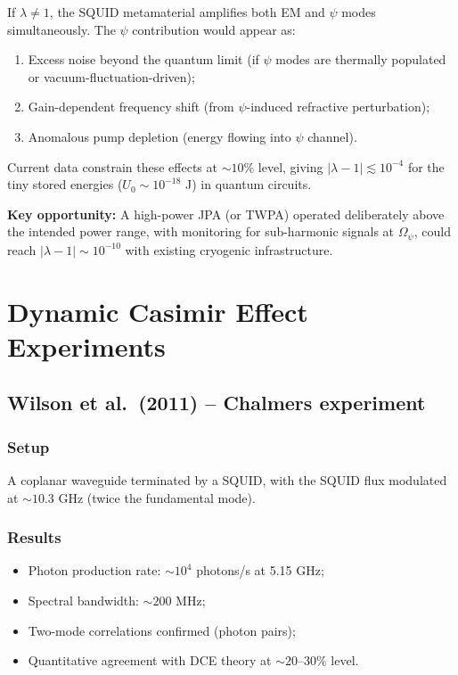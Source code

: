 \documentclass[12pt,letterpaper]{article}
\begin{document}
If $\lambda \neq 1$, the SQUID metamaterial amplifies both EM and
$\psi$ modes simultaneously.  The $\psi$ contribution would appear as:
\begin{enumerate}[noitemsep]
  \item Excess noise beyond the quantum limit (if $\psi$ modes are
    thermally populated or vacuum-fluctuation-driven);
  \item Gain-dependent frequency shift (from $\psi$-induced
    refractive perturbation);
  \item Anomalous pump depletion (energy flowing into $\psi$ channel).
\end{enumerate}

Current data constrain these effects at $\sim 10\%$ level, giving
$|\lambda - 1| \lesssim 10^{-4}$ for the tiny stored energies
($U_0 \sim 10^{-18}$ J) in quantum circuits.

\textbf{Key opportunity:} A high-power JPA (or TWPA) operated
deliberately above the intended power range, with monitoring for
sub-harmonic signals at $\Omega_\psi$, could reach
$|\lambda - 1| \sim 10^{-10}$ with existing cryogenic infrastructure.

\section{Dynamic Casimir Effect Experiments}

\subsection{Wilson et al.\ (2011) -- Chalmers experiment}

\subsubsection{Setup}
A coplanar waveguide terminated by a SQUID, with the SQUID flux
modulated at $\sim 10.3$ GHz (twice the fundamental mode).

\subsubsection{Results}
\begin{itemize}[noitemsep]
  \item Photon production rate: $\sim 10^4$ photons/s at 5.15 GHz;
  \item Spectral bandwidth: $\sim 200$ MHz;
  \item Two-mode correlations confirmed (photon pairs);
  \item Quantitative agreement with DCE theory at $\sim 20$--$30\%$
    level.
\end{itemize}
\end{document}
